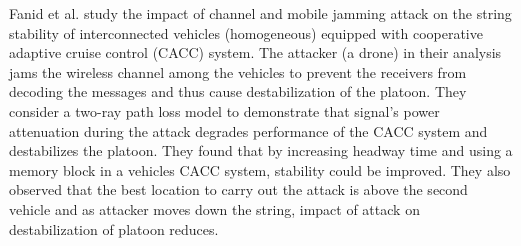 Fanid et al. \cite{FDZZ17} study the impact of channel and mobile jamming attack on the string stability of interconnected vehicles (homogeneous) equipped with  cooperative adaptive cruise control (CACC) system. 
The attacker (a drone) in their analysis jams the wireless channel among the vehicles to prevent the receivers from decoding the messages and thus cause destabilization of the platoon. They consider a two-ray path loss model to demonstrate that signal's power attenuation during the attack degrades performance of the CACC system and destabilizes the platoon. They found that by increasing headway time and using a memory block in a vehicles CACC system, stability could be improved.  They also observed that the best location to carry out the attack is above the second vehicle and as attacker moves down the string, impact of attack on destabilization of platoon reduces.   
       
